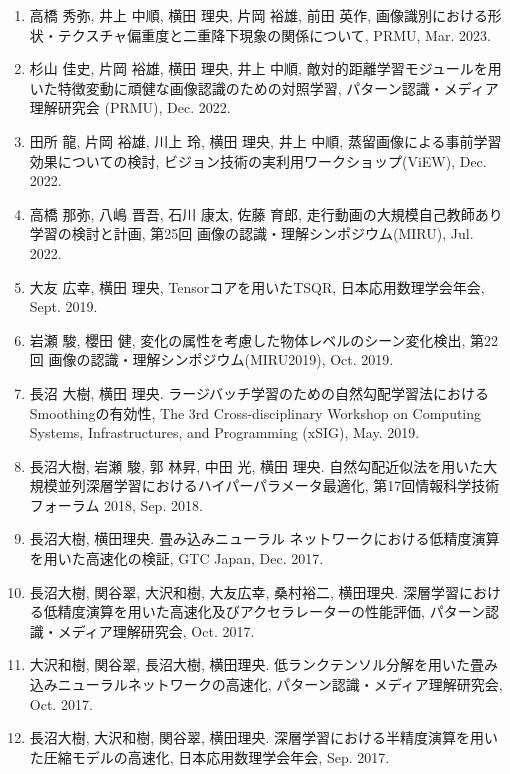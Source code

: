 \documentclass[margin,line]{cv}
\begin{document}
\begin{resume}
\begin{enumerate}
\item 高橋 秀弥, 井上 中順, 横田 理央, 片岡 裕雄, 前田 英作, 画像識別における形状・テクスチャ偏重度と二重降下現象の関係について, PRMU, Mar. 2023.

\item 杉山 佳史, 片岡 裕雄, 横田 理央, 井上 中順, 敵対的距離学習モジュールを用いた特徴変動に頑健な画像認識のための対照学習, パターン認識・メディア理解研究会 (PRMU), Dec. 2022.

\item 田所 龍, 片岡 裕雄, 川上 玲, 横田 理央, 井上 中順, 蒸留画像による事前学習効果についての検討, ビジョン技術の実利用ワークショップ(ViEW), Dec. 2022.

\item 高橋 那弥, 八嶋 晋吾, 石川 康太, 佐藤 育郎, 走行動画の大規模自己教師あり学習の検討と計画, 第25回 画像の認識・理解シンポジウム(MIRU), Jul. 2022.

\item 大友 広幸, 横田 理央, Tensorコアを用いたTSQR, 日本応用数理学会年会, Sept. 2019.

\item 岩瀬 駿, 櫻田 健, 変化の属性を考慮した物体レベルのシーン変化検出, 第22回 画像の認識・理解シンポジウム(MIRU2019), Oct. 2019.

\item 長沼 大樹, 横田 理央. ラージバッチ学習のための自然勾配学習法におけるSmoothingの有効性, The 3rd Cross-disciplinary Workshop on Computing Systems, Infrastructures, and Programming (xSIG), May. 2019.

\item 長沼大樹, 岩瀬 駿, 郭 林昇, 中田 光, 横田 理央. 自然勾配近似法を用いた大規模並列深層学習におけるハイパーパラメータ最適化, 第17回情報科学技術フォーラム 2018, Sep. 2018.

\item 長沼大樹, 横田理央. 畳み込みニューラル ネットワークにおける低精度演算を用いた高速化の検証, GTC Japan, Dec. 2017.

\item 長沼大樹, 関谷翠, 大沢和樹, 大友広幸, 桑村裕二, 横田理央. 深層学習における低精度演算を用いた高速化及びアクセラレーターの性能評価, パターン認識・メディア理解研究会, Oct. 2017.

\item 大沢和樹, 関谷翠, 長沼大樹, 横田理央. 低ランクテンソル分解を用いた畳み込みニューラルネットワークの高速化, パターン認識・メディア理解研究会, Oct. 2017.

\item 長沼大樹, 大沢和樹, 関谷翠, 横田理央. 深層学習における半精度演算を用いた圧縮モデルの高速化, 日本応用数理学会年会, Sep. 2017.


\end{enumerate}
\end{resume}
\end{document}
